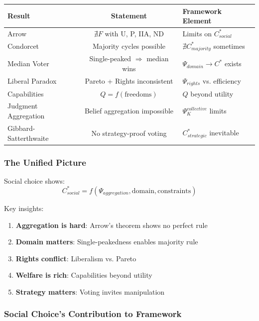 \begin{center}
\renewcommand{\arraystretch}{1.5}
\begin{tabular}{|l|c|l|}
\hline
\textbf{Result} & \textbf{Statement} & \textbf{Framework Element} \\
\hline
Arrow & $\nexists F$ with U, P, IIA, ND & Limits on $C^*_{social}$ \\
\hline
Condorcet & Majority cycles possible & $\nexists C^*_{majority}$ sometimes \\
\hline
Median Voter & Single-peaked $\Rightarrow$ median wins & $\Psi_{domain} \to C^*$ exists \\
\hline
Liberal Paradox & Pareto + Rights inconsistent & $\Psi_{rights}$ vs. efficiency \\
\hline
Capabilities & $Q = f(\text{freedoms})$ & $Q$ beyond utility \\
\hline
Judgment Aggregation & Belief aggregation impossible & $\Psi_K^{collective}$ limits \\
\hline
Gibbard-Satterthwaite & No strategy-proof voting & $C^*_{strategic}$ inevitable \\
\hline
\end{tabular}
\end{center}

\subsubsection{The Unified Picture}

Social choice shows:
\begin{equation}
\boxed{
C^*_{social} = f(\Psi_{aggregation}, \text{domain}, \text{constraints})
}
\end{equation}

Key insights:
\begin{enumerate}
    \item \textbf{Aggregation is hard}: Arrow's theorem shows no perfect rule
    \item \textbf{Domain matters}: Single-peakedness enables majority rule
    \item \textbf{Rights conflict}: Liberalism vs. Pareto
    \item \textbf{Welfare is rich}: Capabilities beyond utility
    \item \textbf{Strategy matters}: Voting invites manipulation
\end{enumerate}

\subsubsection{Social Choice's Contribution to Framework}

